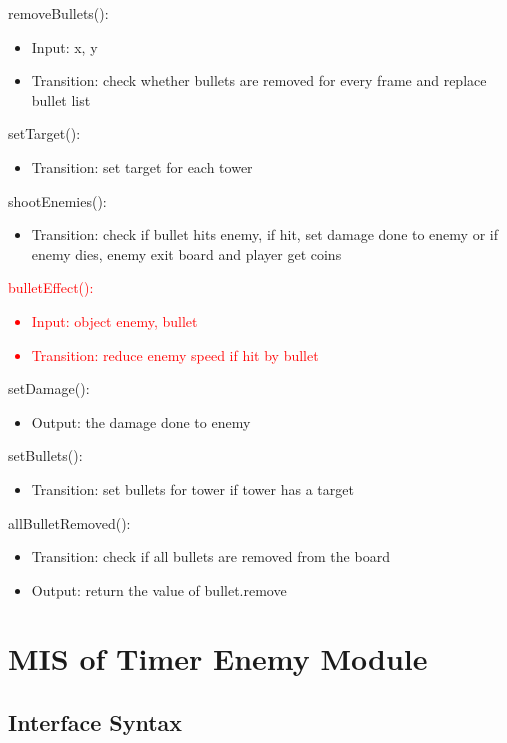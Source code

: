 \documentclass[12,english]{article}
\begin{document}
\noindent removeBullets():
\begin{itemize}
    \item Input: x, y
    \item Transition: check whether bullets are removed for every frame and replace bullet list
\end{itemize}

\noindent setTarget():
\begin{itemize}
    \item Transition: set target for each tower
\end{itemize}

\noindent shootEnemies():
\begin{itemize}
    \item Transition: check if bullet hits enemy, if hit, set damage done to enemy or if enemy dies, enemy exit board and player get coins
\end{itemize}

\noindent \textcolor{red}{bulletEffect():}
\textcolor{red}{\begin{itemize}
    \item Input: object enemy, bullet
    \item Transition: reduce enemy speed if hit by bullet
\end{itemize}}


\noindent setDamage():
\begin{itemize}
    \item Output: the damage done to enemy
\end{itemize}

\noindent setBullets():
\begin{itemize}
    \item Transition: set bullets for tower if tower has a target
\end{itemize}

\noindent allBulletRemoved():
\begin{itemize}
    \item Transition: check if all bullets are removed from the board
    \item Output: return the value of bullet.remove
\end{itemize}


\section{MIS of Timer Enemy Module}
\subsection{Interface Syntax}
\end{document}
